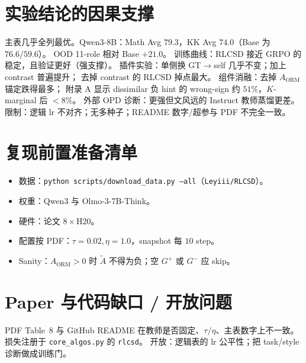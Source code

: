 \documentclass[11pt,a4paper]{ctexart}
\begin{document}
\section{实验结论的因果支撑}
主表几乎全列最优。Qwen3-8B：Math Avg $79.3$，KK Avg $74.0$（Base 为 $76.6/59.6$）。
OOD 11-role 相对 Base $+21.0$。
训练曲线：RLCSD 接近 GRPO 的稳定，且验证更好（强支撑）。
插件实验：单侧换 GT$\to$self 几乎不变；加上 contrast 普遍提升；
去掉 contrast 的 RLCSD 掉点最大。
组件消融：去掉 $A_{\mathrm{ORM}}$ 锚定跌得最多；
附录 A 显示 dissimilar 负 hint 的 wrong-sign 约 $51\%$，$K$-marginal 后 $<8\%$。
外部 OPD 诊断：更强但文风远的 Instruct 教师蒸馏更差。
限制：逻辑 lr 不对齐；无多种子；README 数字/超参与 PDF 不完全一致。

\section{复现前置准备清单}
\begin{itemize}
\item 数据：\texttt{python scripts/download\_data.py --all}（\texttt{Leyiii/RLCSD}）。
\item 权重：Qwen3 与 Olmo-3-7B-Think。
\item 硬件：论文 $8\times$H20。
\item 配置按 PDF：$\tau=0.02,\eta=1.0$，snapshot 每 $10$ step。
\item Sanity：$A_{\mathrm{ORM}}>0$ 时 $\tilde A$ 不得为负；空 $G^+$ 或 $G^-$ 应 skip。
\end{itemize}

\section{Paper 与代码缺口 / 开放问题}
PDF Table~8 与 GitHub README 在教师是否固定、$\tau/\eta$、主表数字上不一致。
损失注册于 \texttt{core\_algos.py} 的 \texttt{rlcsd}。
开放：逻辑表的 lr 公平性；把 task/style 诊断做成训练门。
\end{document}
